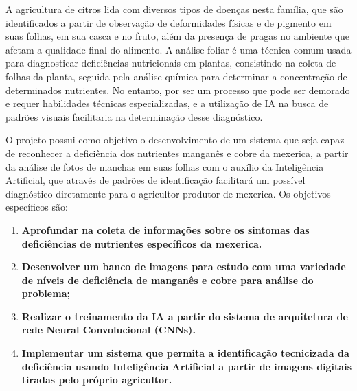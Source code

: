 A agricultura de citros lida com diversos tipos de doenças nesta família, que são identificados a partir de observação de deformidades físicas e de pigmento em suas folhas, em sua casca e no fruto, além da presença de pragas no ambiente que afetam a qualidade final do alimento. A análise foliar é uma técnica comum usada para diagnosticar deficiências nutricionais em plantas, consistindo na coleta de folhas da planta, seguida pela análise química para determinar a concentração de determinados nutrientes. No entanto, por ser um processo que pode ser demorado e requer habilidades técnicas especializadas, e a utilização de IA na busca de padrões visuais facilitaria na determinação desse diagnóstico.

O projeto possui como objetivo o desenvolvimento de um sistema que seja capaz de reconhecer a deficiência dos nutrientes manganês e cobre da mexerica, a partir da análise de fotos de manchas em suas folhas com o auxílio da Inteligência Artificial, que através de padrões de identificação facilitará um possível diagnóstico diretamente para o agricultor produtor de mexerica. Os objetivos específicos são:
\begin{enumerate}
\item\textbf{Aprofundar na coleta de informações sobre os sintomas das deficiências de nutrientes específicos da mexerica.}
\item\textbf{Desenvolver um banco de imagens para estudo com uma variedade de níveis de deficiência de manganês e cobre para análise do problema;} 
\item\textbf{Realizar o treinamento da IA a partir do sistema de arquitetura de rede Neural Convolucional (CNNs).}
\item\textbf{Implementar um sistema que permita a identificação tecnicizada da deficiência usando Inteligência Artificial a partir de imagens digitais tiradas pelo próprio agricultor.}
\end{enumerate}